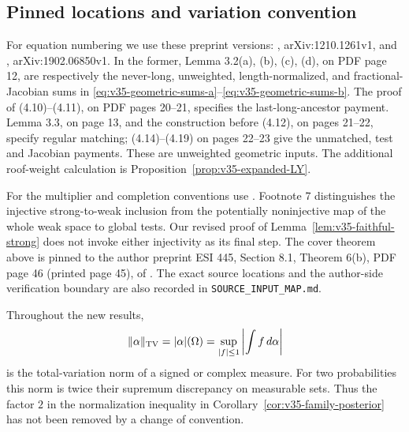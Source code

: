 \subsection{Pinned locations and variation convention}
For equation numbering we use these preprint versions:
\cite{DZ}, arXiv:1210.1261v1, and \cite{DPZ},
arXiv:1902.06850v1. In the former,
Lemma 3.2(a), (b), (c), (d), on PDF page 12, are respectively the
never-long, unweighted, length-normalized, and fractional-Jacobian
sums in \eqref{eq:v35-geometric-sums-a}--\eqref{eq:v35-geometric-sums-b}.
The proof of (4.10)--(4.11), on PDF pages 20--21, specifies the
last-long-ancestor payment. Lemma 3.3, on page 13, and the construction
before (4.12), on pages 21--22, specify regular matching; (4.14)--(4.19)
on pages 22--23 give the unmatched, test and Jacobian payments.
These are unweighted geometric inputs. The additional roof-weight
calculation is Proposition~\ref{prop:v35-expanded-LY}.

For the multiplier and completion conventions use \cite[Lemmas 3.2(c),
3.3(b), footnote 7, and Lemma 3.9]{DPZ}. Footnote 7 distinguishes the
injective strong-to-weak inclusion from the potentially noninjective
map of the whole weak space to global tests. Our revised proof of
Lemma~\ref{lem:v35-faithful-strong} does not invoke either injectivity
as its final step. The cover theorem above is pinned to the author
preprint ESI 445, Section 8.1, Theorem 6(b), PDF page 46 (printed page
45), of \cite{Young}. The exact source locations and the author-side
verification boundary are also recorded in \texttt{SOURCE\_INPUT\_MAP.md}.

Throughout the new results,
\[
 \|\alpha\|_{\rm TV}=|\alpha|(\Omega)
       =\sup_{|f|\le1}\left|\int f\,d\alpha\right|
\]
is the total-variation norm of a signed or complex measure. For two
probabilities this norm is twice their supremum discrepancy on
measurable sets. Thus the factor $2$ in the normalization inequality
in Corollary~\ref{cor:v35-family-posterior} has not been removed by a
change of convention.
